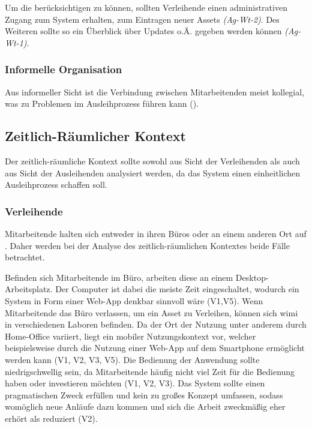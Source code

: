 Um die  berücksichtigen zu können, sollten Verleihende
einen administrativen Zugang zum System erhalten, zum Eintragen neuer Assets
\textit{(Ag-Wt-2)}. Des Weiteren sollte so ein Überblick über Updates o.Ä.
gegeben werden können \textit{(Ag-Wt-1)}.

\subsubsection{Informelle Organisation} Aus informeller Sicht ist die Verbindung zwischen
Mitarbeitenden meist kollegial, was zu Problemen im Ausleihprozess führen kann
().

\subsection{Zeitlich-Räumlicher Kontext}
\label{section:zeit}
Der zeitlich-räumliche Kontext sollte sowohl aus Sicht der Verleihenden als auch
aus Sicht der Ausleihenden analysiert werden, da das System einen einheitlichen
Ausleihprozess schaffen soll.

\subsubsection{Verleihende}
Mitarbeitende halten sich entweder in ihren Büros oder an einem anderen Ort auf
. Daher werden
bei der Analyse des zeitlich-räumlichen Kontextes beide Fälle
betrachtet.

Befinden sich Mitarbeitende im Büro, arbeiten diese an einem
Desktop-Arbeitsplatz. Der Computer ist dabei die meiste Zeit eingeschaltet,
wodurch ein System in Form einer Web-App denkbar sinnvoll wäre (V1,V5). Wenn
Mitarbeitende das Büro verlassen, um ein Asset zu Verleihen, können sich
\ac{wimi} in verschiedenen Laboren befinden. Da der Ort der Nutzung unter
anderem durch Home-Office variiert, liegt ein mobiler Nutzungskontext vor,
welcher beispielsweise durch die Nutzung einer Web-App auf dem Smartphone
ermöglicht werden kann (V1, V2, V3, V5). Die Bedienung der Anwendung sollte
niedrigschwellig sein, da Mitarbeitende häufig nicht viel Zeit für die Bedienung
haben oder investieren möchten (V1, V2, V3). Das System sollte einen
pragmatischen Zweck erfüllen und kein zu großes Konzept umfassen, sodass
womöglich neue Anläufe dazu kommen und sich die Arbeit zweckmäßig eher erhört
als reduziert (V2).

